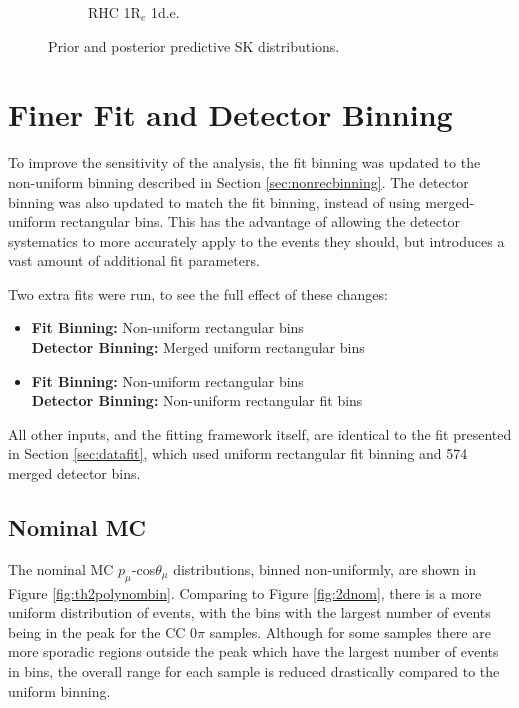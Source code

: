 \begin{figure}
\begin{subfigure}{.49\textwidth}
   \caption{RHC 1R$_{e}$ 1d.e.}
  \label{fig:skppnuebar}
\end{subfigure}
\caption{Prior and posterior predictive SK distributions.}
\label{fig:skpp}
\end{figure}

\section{Finer Fit and Detector Binning}\label{sec:newbin}

To improve the sensitivity of the analysis, the fit binning was updated to the non-uniform binning described in Section \ref{sec:nonrecbinning}. The detector binning was also updated to match the fit binning, instead of using merged-uniform rectangular bins. This has the advantage of allowing the detector systematics to more accurately apply to the events they should, but introduces a vast amount of additional fit parameters.

Two extra fits were run, to see the full effect of these changes:

\begin{itemize}

\item \textbf{Fit Binning: } Non-uniform rectangular bins\\
\textbf{Detector Binning: } Merged uniform rectangular bins

\item \textbf{Fit Binning: } Non-uniform rectangular bins\\
\textbf{Detector Binning: } Non-uniform rectangular fit bins

\end{itemize}

All other inputs, and the fitting framework itself, are identical to the fit presented in Section \ref{sec:datafit}, which used uniform rectangular fit binning and 574 merged detector bins.

\subsection{Nominal MC}

The nominal MC $p_{\mu}$-cos$\theta_{\mu}$ distributions, binned non-uniformly, are shown in Figure \ref{fig:th2polynombin}. Comparing to Figure \ref{fig:2dnom}, there is a more uniform distribution of events, with the bins with the largest number of events being in the peak for the CC $0\pi$ samples. Although for some samples there are more sporadic regions outside the peak which have the largest number of events in bins, the overall range for each sample is reduced drastically compared to the uniform binning.

